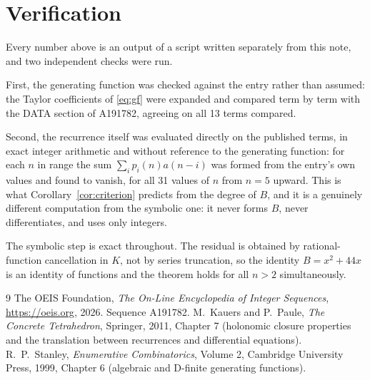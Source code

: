 \documentclass[11pt,a4paper]{article}
\theoremstyle{plain}
\theoremstyle{definition}
\begin{document}
\section{Verification}

Every number above is an output of a script written separately from this note, and two
independent checks were run.

First, the generating function was checked against the entry rather than assumed: the
Taylor coefficients of \eqref{eq:gf} were expanded and compared term by term with the DATA
section of A191782, agreeing on all 13 terms compared.

Second, the recurrence itself was evaluated directly on the published terms, in exact
integer arithmetic and without reference to the generating function: for each $n$ in range
the sum $\sum_{i}p_{i}(n)a(n-i)$ was formed from the entry's own values and found to
vanish, for all 31 values of $n$ from $n=5$ upward. This is what
Corollary~\ref{cor:criterion} predicts from the degree of $B$, and it is a genuinely
different computation from the symbolic one: it never forms $B$, never differentiates, and
uses only integers.

The symbolic step is exact throughout. The residual is obtained by rational-function
cancellation in $K$, not by series truncation, so the identity $B=x^{2} + 44 x$ is an
identity of functions and the theorem holds for all $n>2$ simultaneously.

\begin{thebibliography}{9}
 The OEIS Foundation, \emph{The On-Line Encyclopedia of Integer Sequences},
\url{https://oeis.org}, 2026. Sequence A191782.
 M.~Kauers and P.~Paule, \emph{The Concrete Tetrahedron}, Springer, 2011,
Chapter 7 (holonomic closure properties and the translation between recurrences and
differential equations).
 R.~P.~Stanley, \emph{Enumerative Combinatorics}, Volume 2, Cambridge
University Press, 1999, Chapter 6 (algebraic and D-finite generating functions).
\end{thebibliography}
\end{document}
